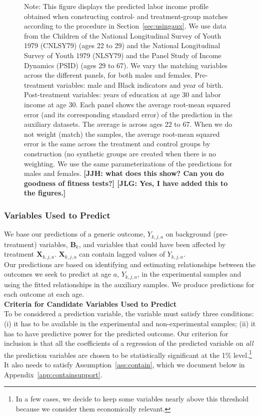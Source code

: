 \begin{figure}
Note: This figure displays the predicted labor income profile obtained when constructing control- and treatment-group matches according to the procedure in Section~\ref{sec:usingaux}. We use data from the Children of the National Longitudinal Survey of Youth 1979 (CNLSY79) (ages 22 to 29) and the National Longitudinal Survey of Youth 1979 (NLSY79) and the Panel Study of Income Dynamics (PSID) (ages 29 to 67). We vary the matching variables across the different panels, for both males and females. Pre-treatment variables: male and Black indicators and year of birth. Post-treatment variables: years of education at age 30 and labor income at age 30. Each panel shows the average root-mean squared error (and its corresponding standard error) of the prediction in the auxiliary datasets. The average is across ages 22 to 67. When we do not weight (match) the samples, the average root-mean squared error is the same across the treatment and control groups by construction (no synthetic groups are created when there is no weighting. We use the same parameterizations of the predictions for males and females. \textbf{[JJH: what does this show? Can you do goodness of fitness tests?] [JLG: Yes, I have added this to the figures.]}
\end{figure}

\subsubsection{Variables Used to Predict} \label{appendix:pred}

We base our predictions of a generic outcome, $Y_{k,j,a}$ on background (pre-treatment) variables, $\bm{B}_k$, and variables that could have been affected by treatment $\bm{X}_{k,j,a}$. $\bm{X}_{k,j,a}$ can contain lagged values of $Y_{k,j,a}$.\\

\noindent Our predictions are based on identifying and estimating relationships between the outcomes we seek to predict at age $a$, $Y_{k,j,a}$, in the experimental samples and using the fitted relationships in the auxiliary samples. We produce predictions for each outcome at each age.\\

\noindent \textbf{Criteria for Candidate Variables Used to Predict}\\
\noindent To be considered a prediction variable, the variable must satisfy three conditions: (i) it has to be available in the experimental and non-experimental samples; (ii) it has to have predictive power for the predicted outcome. Our criterion for inclusion is that all the coefficients of a regression of the predicted variable on \textit{all} the prediction variables are chosen to be statistically significant at the 1\% level.\footnote{In a few cases, we decide to keep some variables nearly above this threshold because we consider them economically relevant.} It also needs to satisfy Assumption~\ref{ass:contain}, which we document below in Appendix~\ref{app:containsupport}.\\

